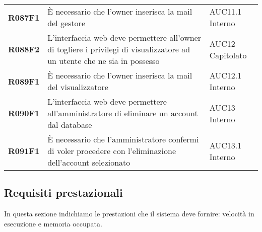 \documentclass[../analisi-dei-requisiti.tex]{subfiles}
\begin{document}
\begin{longtable}[H]{>{\centering\bfseries}m{3cm} >{\centering}m{10cm} >{\centering\arraybackslash}m{3cm}}
  R087F1                               & È necessario che l'owner inserisca la mail del gestore                                                                                                                                                  & AUC11.1 Interno               \\
  R088F2                               & L'interfaccia web deve permettere all'owner di togliere i privilegi di visualizzatore ad un utente che ne sia in possesso                                                                               & AUC12 Capitolato              \\
  R089F1                               & È necessario che l'owner inserisca la mail del visualizzatore                                                                                                                                           & AUC12.1 Interno               \\
  R090F1                               & L'interfaccia web deve permettere all'amministratore di eliminare un account dal database                                                                                                               & AUC13 Interno                 \\
  R091F1                               & È necessario che l'amministratore confermi di voler procedere con l'eliminazione dell'account selezionato                                                                                               & AUC13.1 Interno               \\
\end{longtable}

\newpage
\subsection{Requisiti prestazionali}%
\label{sub:requisiti_prestazionali}
In questa sezione indichiamo le prestazioni che il sistema deve fornire: velocità in esecuzione e memoria occupata.
\end{document}
